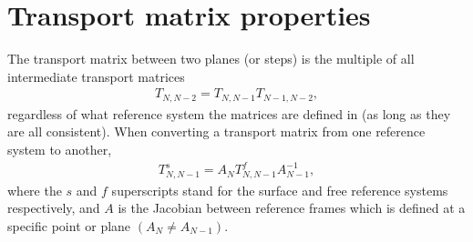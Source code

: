 
\thispagestyle{myheadings}

\chapter{Transport matrix properties}
\label{app:transportmatrixproperties}


The transport matrix between two planes (or steps) is the multiple of all intermediate transport matrices
    \begin{align}
        T_{N,N-2} = T_{N,N-1} T_{N-1,N-2},
    \end{align}
regardless of what reference system the matrices are defined in (as long as they are all consistent). When converting a transport matrix from one reference system to another,
    \begin{align}
        T_{N,N-1}^{s} = A_{N} T_{N,N-1}^{f} A_{N-1}^{-1},
    \end{align}
where the $s$ and $f$ superscripts stand for the surface and free reference systems respectively, and $A$ is the Jacobian between reference frames which is defined at a specific point or plane $(A_{N} \neq A_{N-1})$.

